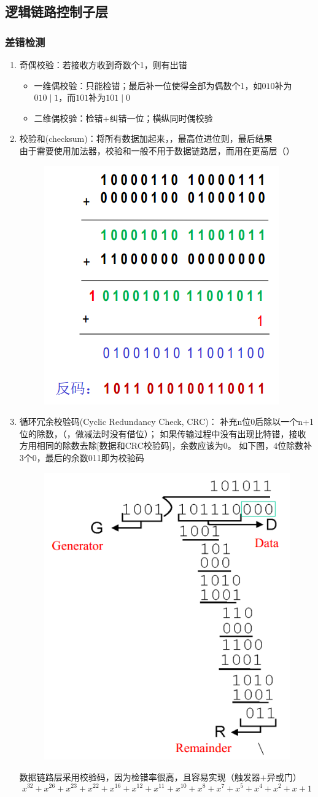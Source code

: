\subsection{逻辑链路控制子层}
\subsubsection{差错检测}
\begin{enumerate}
\item 奇偶校验：若接收方收到奇数个1，则有出错
\begin{itemize}
	\item 一维偶校验：只能检错；最后补一位使得全部为偶数个1，如$010$补为$010\mid 1$，而$101$补为$101\mid 0$
	\item 二维偶校验：检错+纠错一位；横纵同时偶校验
\end{itemize}
\item 校验和(checksum)：将所有数据加起来，，最高位进位则，最后结果\\
由于需要使用加法器，校验和一般不用于数据链路层，而用在更高层（）
\begin{figure}[H]
	\centering
	\includegraphics[width=0.3\linewidth]{fig/checksum.PNG}
\end{figure}
\item 循环冗余校验码(Cyclic Redundancy Check, CRC)：
补充n位0后除以一个n+1位的除数，（，做减法时没有借位）；
如果传输过程中没有出现比特错，接收方用相同的除数去除[数据和CRC校验码]，余数应该为0。
如下图，4位除数补3个0，最后的余数011即为校验码
\begin{figure}[H]
	\centering
	\includegraphics[width=0.3\linewidth]{fig/CRC.PNG}
\end{figure}
数据链路层采用校验码，因为检错率很高，且容易实现（触发器+异或门）
\[x^{{32}}+x^{{26}}+x^{{23}}+x^{{22}}+x^{{16}}+x^{{12}}+x^{{11}}+x^{{10}}+x^{8}+x^{7}+x^{5}+x^{4}+x^{2}+x+1\]
\end{enumerate}

